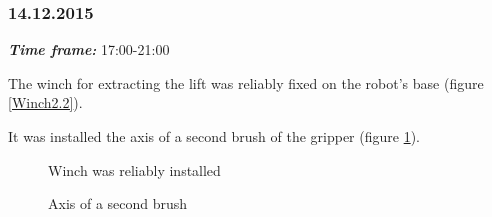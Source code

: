 \subsubsection{14.12.2015}
\textit{\textbf{Time frame:}} 17:00-21:00

The winch for extracting the lift was reliably fixed on the robot's base (figure \ref{Winch2.2}).

It was installed the axis of a second brush of the gripper (figure \ref{Gripper2.1}).

\begin{figure}[H]
	\begin{minipage}[h]{0.47\linewidth}
		\caption{Winch was reliably installed}
		\label{Winch2.2}
	\end{minipage}
	\hfill
	\begin{minipage}[h]{0.47\linewidth}
		\caption{Axis of a second brush}
		\label{Gripper2.1}
	\end{minipage}
\end{figure}
